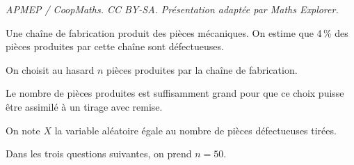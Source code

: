 \documentclass[10pt]{article}
\begin{document}
\noindent\textit{APMEP / CoopMaths. CC BY-SA. Présentation adaptée par Maths Explorer.}\par\medskip
\medskip










Une chaîne de fabrication produit des pièces mécaniques. On estime que 4\,\% des pièces produites par cette chaîne sont défectueuses.

On choisit au hasard $n$ pièces produites par la chaîne de fabrication. 

Le nombre de pièces produites est suffisamment grand pour que ce choix puisse être assimilé à un tirage avec remise. 

On note $X$ la variable aléatoire égale au nombre de pièces défectueuses tirées.

Dans les trois questions suivantes, on prend $n = 50$.

\medskip
\end{document}
